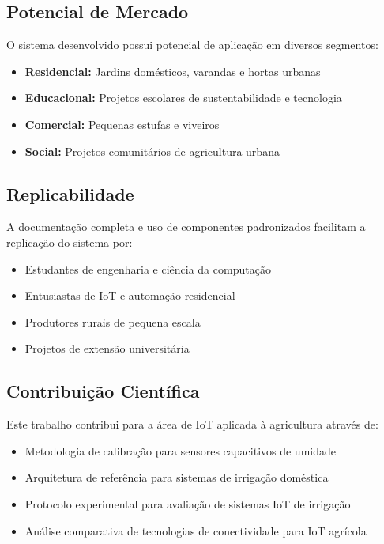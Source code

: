 \documentclass[twoside,english,brazilian]{UNISINOSmonografia}
\begin{document}
\subsection{Potencial de Mercado}
O sistema desenvolvido possui potencial de aplicação em diversos segmentos:
\begin{itemize}
    \item \textbf{Residencial:} Jardins domésticos, varandas e hortas urbanas
    \item \textbf{Educacional:} Projetos escolares de sustentabilidade e tecnologia
    \item \textbf{Comercial:} Pequenas estufas e viveiros
    \item \textbf{Social:} Projetos comunitários de agricultura urbana
\end{itemize}

\subsection{Replicabilidade}
A documentação completa e uso de componentes padronizados facilitam a replicação do sistema por:
\begin{itemize}
    \item Estudantes de engenharia e ciência da computação
    \item Entusiastas de IoT e automação residencial
    \item Produtores rurais de pequena escala
    \item Projetos de extensão universitária
\end{itemize}

\subsection{Contribuição Científica}
Este trabalho contribui para a área de IoT aplicada à agricultura através de:
\begin{itemize}
    \item Metodologia de calibração para sensores capacitivos de umidade
    \item Arquitetura de referência para sistemas de irrigação doméstica
    \item Protocolo experimental para avaliação de sistemas IoT de irrigação
    \item Análise comparativa de tecnologias de conectividade para IoT agrícola
\end{itemize}

\end{document}
